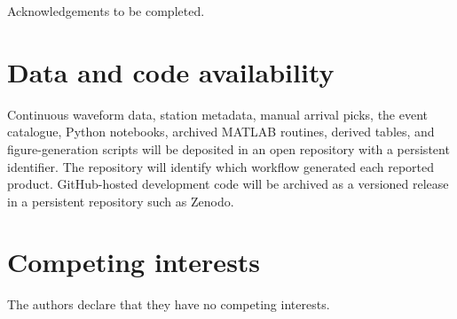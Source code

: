 \documentclass[]{seismica}
\begin{document}
\begin{acknowledgements}
Acknowledgements to be completed.
\end{acknowledgements}

\section*{Data and code availability}

Continuous waveform data, station metadata, manual arrival picks, the event catalogue, Python notebooks, archived MATLAB routines, derived tables, and figure-generation scripts will be deposited in an open repository with a persistent identifier. The repository will identify which workflow generated each reported product. GitHub-hosted development code will be archived as a versioned release in a persistent repository such as Zenodo.

\section*{Competing interests}

The authors declare that they have no competing interests.


\end{document}
